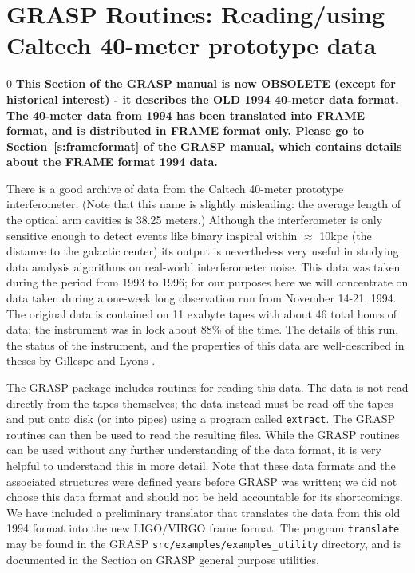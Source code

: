 \section{GRASP Routines: Reading/using Caltech 40-meter prototype data}
\setcounter{equation}0
\label{s:40meter}
{\bf
This Section of the GRASP manual is now OBSOLETE
(except for historical interest)  - it describes the OLD
1994 40-meter data format.  The 40-meter data from 1994 has been
translated into FRAME format, and is distributed in FRAME format only.
Please go to Section~\ref{s:frameformat} of the GRASP manual, which contains details about the FRAME format 1994 data.
}

There is a good archive of data from the Caltech 40-meter prototype
interferometer.
(Note that this name is slightly misleading: the average length of the optical
arm cavities is 38.25 meters.)
Although the interferometer is only sensitive enough
to detect events like binary inspiral within $\approx$ 10kpc (the
distance to the galactic center) its output is nevertheless very useful
in studying data analysis algorithms on real-world interferometer
noise.  This data was taken during the period from 1993 to 1996; for
our purposes here we will concentrate on data taken during a one-week
long observation run from November 14-21, 1994.  The original data is
contained on 11 exabyte tapes with about 46 total hours of data; the
instrument was in lock about 88\% of the time.  The details of this
run, the status of the instrument, and the properties of this data are
well-described in theses by Gillespe \cite{Gillespie} and Lyons
\cite{Lyons}.

The GRASP package includes routines for reading this data.  The data is
not read directly from the tapes themselves; the data instead must be
read off the tapes and put onto disk (or into pipes) using a program
called {\tt extract}.  The GRASP routines can then be used to read
the resulting files.  While the GRASP routines can be used without any
further understanding of the data format, it is very helpful to understand
this in more detail.  Note that these data formats and the associated
structures were defined years before GRASP was written; we did not choose
this data format and should not be held accountable for its shortcomings.
We have included a preliminary translator that translates the data from
this old 1994 format into the new LIGO/VIRGO frame format.  The program
{\tt translate} may be found in the GRASP {\tt src/examples/examples\_utility} directory,
and is documented in the Section on GRASP general purpose utilities.

